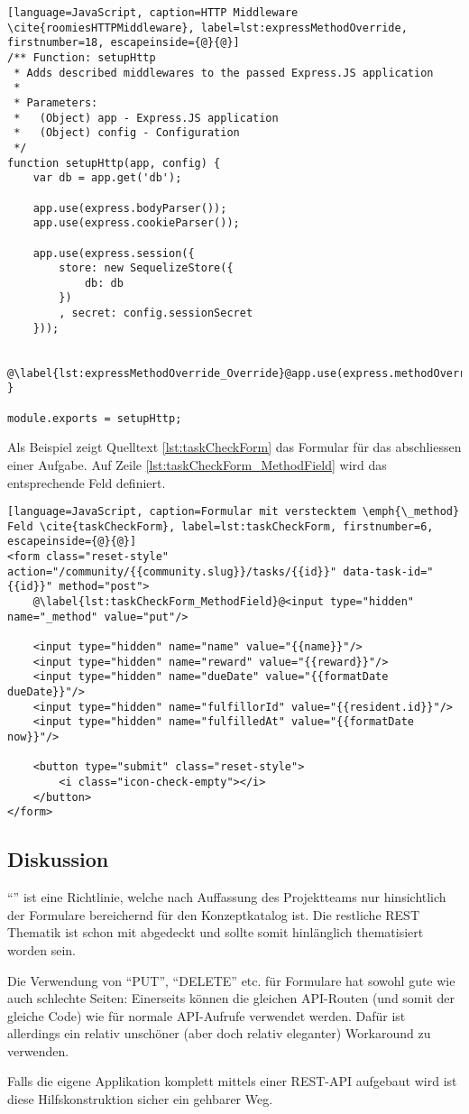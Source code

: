 \begin{lstlisting}[language=JavaScript, caption=HTTP Middleware \cite{roomiesHTTPMiddleware}, label=lst:expressMethodOverride, firstnumber=18, escapeinside={@}{@}]
/** Function: setupHttp
 * Adds described middlewares to the passed Express.JS application
 *
 * Parameters:
 *   (Object) app - Express.JS application
 *   (Object) config - Configuration
 */
function setupHttp(app, config) {
	var db = app.get('db');

	app.use(express.bodyParser());
	app.use(express.cookieParser());

	app.use(express.session({
		store: new SequelizeStore({
			db: db
		})
		, secret: config.sessionSecret
	}));

	@\label{lst:expressMethodOverride_Override}@app.use(express.methodOverride());
}

module.exports = setupHttp;
\end{lstlisting}

Als Beispiel zeigt Quelltext \ref{lst:taskCheckForm} das Formular für das abschliessen einer Aufgabe. Auf Zeile \ref{lst:taskCheckForm_MethodField} wird das entsprechende Feld definiert.

\begin{lstlisting}[language=JavaScript, caption=Formular mit verstecktem \emph{\_method} Feld \cite{taskCheckForm}, label=lst:taskCheckForm, firstnumber=6, escapeinside={@}{@}]
<form class="reset-style" action="/community/{{community.slug}}/tasks/{{id}}" data-task-id="{{id}}" method="post">
	@\label{lst:taskCheckForm_MethodField}@<input type="hidden" name="_method" value="put"/>

	<input type="hidden" name="name" value="{{name}}"/>
	<input type="hidden" name="reward" value="{{reward}}"/>
	<input type="hidden" name="dueDate" value="{{formatDate dueDate}}"/>
	<input type="hidden" name="fulfillorId" value="{{resident.id}}"/>
	<input type="hidden" name="fulfilledAt" value="{{formatDate now}}"/>

	<button type="submit" class="reset-style">
		<i class="icon-check-empty"></i>
	</button>
</form>
\end{lstlisting}

\subsection*{Diskussion}

``'' ist eine Richtlinie, welche nach Auffassung des Projektteams nur hinsichtlich der Formulare bereichernd für den Konzeptkatalog ist. Die restliche \gls{REST} Thematik ist schon mit  abgedeckt und sollte somit hinlänglich thematisiert worden sein.

Die Verwendung von ``PUT'', ``DELETE'' etc. für Formulare hat sowohl gute wie auch schlechte Seiten: Einerseits können die gleichen API-Routen (und somit der gleiche Code) wie für normale API-Aufrufe verwendet werden. Dafür ist allerdings ein relativ unschöner (aber doch relativ eleganter) Workaround zu verwenden.

Falls die eigene Applikation komplett mittels einer \gls{REST}-API aufgebaut wird ist diese Hilfskonstruktion sicher ein gehbarer Weg.